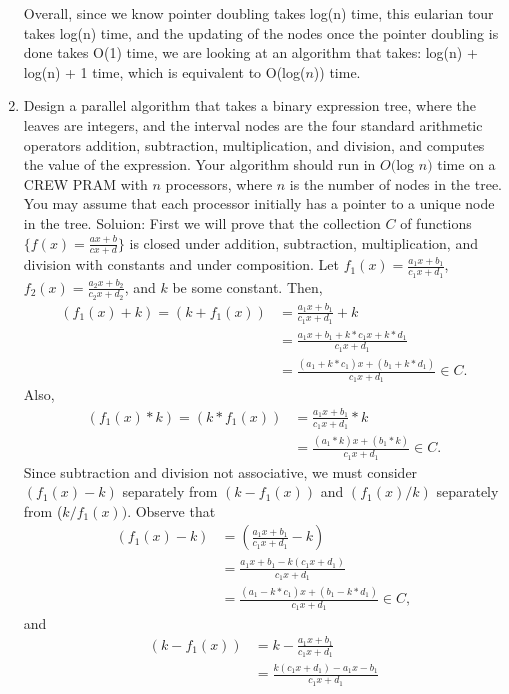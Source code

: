 \documentclass{article}
\begin{document}
\begin{enumerate}
Overall, since we know pointer doubling takes log(n) time, this eularian tour takes log(n) time, and the updating of the nodes once the pointer doubling is done takes O(1) time, we are looking at an algorithm that takes:
log(n) + log(n) + 1 time, which is equivalent to O(log($n$)) time.
\newline
\setcounter{enumi}{22}
\item Design a parallel algorithm that takes a binary expression tree, where the leaves are integers, and the interval nodes are the four standard arithmetic operators addition, subtraction, multiplication, and division, and computes the value of the expression. Your algorithm should run in $O($log $n)$ time on a CREW PRAM with $n$ processors, where $n$ is the number of nodes in the tree. You may assume that each processor initially has a pointer to a unique node in the tree.
\newline
\newline Soluion: First we will prove that the collection $C$ of functions $\{f(x)=\frac{ax+b}{cx+d}\}$ is closed under addition, subtraction, multiplication, and division with constants and under composition. Let $f_1(x)=\frac{a_1x+b_1}{c_1x+d_1}$, $f_2(x)=\frac{a_2x+b_2}{c_2x+d_2}$, and $k$ be some constant. Then,
\begin{align*}
(f_1(x)+k)=(k+f_1(x)) &=\frac{a_1x+b_1}{c_1x+d_1}+k\\
&=\frac{a_1x+b_1+k*c_1x+k*d_1}{c_1x+d_1}\\
&=\frac{(a_1+k*c_1)x+(b_1+k*d_1)}{c_1x+d_1}\in C.
\end{align*}
 Also,
\begin{align*}
(f_1(x)*k)=(k*f_1(x))&=\frac{a_1x+b_1}{c_1x+d_1}*k\\
&=\frac{(a_1*k)x+(b_1*k)}{c_1x+d_1}\in C.
\end{align*}
 Since subtraction and division not associative, we must consider $(f_1(x)-k)$ separately from $(k-f_1(x))$ and $(f_1(x)/k)$ separately from ($k/f_1(x))$. Observe that 
\begin{align*}
(f_1(x)-k)&=(\frac{a_1x+b_1}{c_1x+d_1}-k)\\
&=\frac{a_1x+b_1-k(c_1x+d_1)}{c_1x+d_1}\\
&=\frac{(a_1-k*c_1)x+(b_1-k*d_1)}{c_1x+d_1}\in C,
\end{align*} and
\begin{align*}
(k-f_1(x))&=k-\frac{a_1x+b_1}{c_1x+d_1}\\
&=\frac{k(c_1x+d_1)-a_1x-b_1}{c_1x+d_1}\\

\end{align*}
\end{enumerate}
\end{document}
